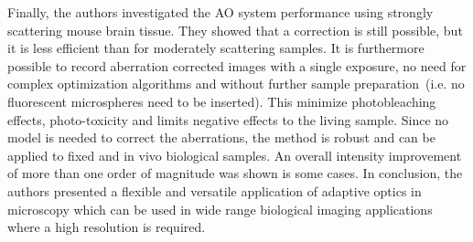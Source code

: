 Finally, the authors investigated the AO system performance using strongly scattering mouse brain tissue. They showed that a correction is still possible, but it is less efficient than for moderately scattering samples. It is furthermore possible to record aberration corrected images with a single exposure, no need for complex optimization algorithms and without further sample preparation~(i.e. no fluorescent microspheres need to be inserted). This minimize photobleaching effects, photo-toxicity and limits negative effects to the living sample. Since no model is needed to correct the aberrations, the method is robust and can be applied to fixed and in vivo biological samples. An overall intensity improvement of more than one order of magnitude was shown is some cases. In conclusion, the authors presented a flexible and versatile application of adaptive optics in microscopy which can be used in wide range biological imaging applications where a high resolution is required. 

